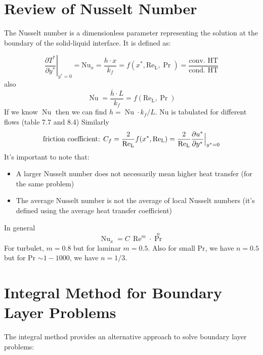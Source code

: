 \section*{Review of Nusselt Number}
The Nusselt number is a dimensionless parameter representing the solution at the boundary of the solid-liquid interface. It is defined as:

\[
    \left.\frac{\partial T^*}{\partial y^*}\right|_{y^*=0} = \text{Nu}_x = \frac{h \cdot x}{k_f} = f(x^*,\operatorname{Re_L},\operatorname{Pr}) = \frac{\text{conv. HT}}{\text{cond. HT}}
\]
%
also
\[
        \overline{\operatorname{Nu}} =\frac{\overline{h} \cdot L}{k_f} = f(\operatorname{Re_L}, \operatorname{Pr})
\]
%
If we know $\operatorname{Nu}$ then we can find $ h = \operatorname{Nu} \cdot k_f / L$. Nu is tabulated for different flows (table 7.7 and 8.4)
%
Similarly 
\[
           \text{friction coefficient: } C_f = \frac{2}{\operatorname{Re_L}} f(x^*,\operatorname{Re_L}) = \frac{2}{\operatorname{Re_L}}\frac{\partial u^*}{\partial y^*} \Bigl \vert_{y^*=0}
\]
%
It's important to note that:
%
\begin{itemize}
    \item A larger Nusselt number does not necessarily mean higher heat transfer (for the same problem)
    \item The average Nusselt number is not the average of local Nusselt numbers (it's defined using the average heat transfer coefficient)
\end{itemize}
%
\begin{definition}
In general
    \[
        \operatorname{Nu}_{x}=C \,\operatorname{Re}^m \cdot\operatorname{Pr}^n
    \]
    For turbulet, $m=0.8$ but for laminar $m=0.5$. Also for small Pr, we have $n=0.5$ but for Pr $\sim 1-1000$, we have $n = 1/3$.
\end{definition}

\section*{Integral Method for Boundary Layer Problems}
The integral method provides an alternative approach to solve boundary layer problems:

